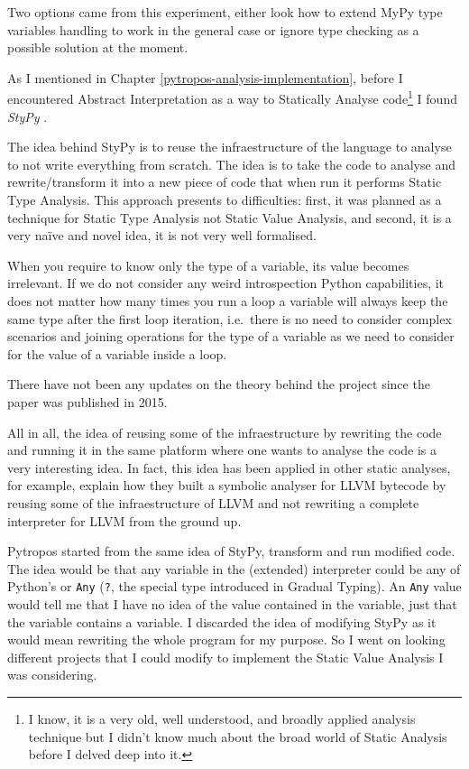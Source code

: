 Two options came from this experiment, either look how to extend MyPy
type variables handling to work in the general case or ignore type
checking as a possible solution at the moment.

{}

As I mentioned in Chapter \ref{pytropos-analysis-implementation}, before
I encountered Abstract Interpretation as a way to Statically Analyse
code\footnote{I know, it is a very old, well understood, and broadly
  applied analysis technique but I didn't know much about the broad
  world of Static Analysis before I delved deep into it.} I found
\emph{StyPy} \autocite{ortin_towards_2015}.

The idea behind StyPy is to reuse the infraestructure of the language to
analyse to not write everything from scratch. The idea is to take the
code to analyse and rewrite/transform it into a new piece of code that
when run it performs Static Type Analysis. This approach presents to
difficulties: first, it was planned as a technique for Static Type
Analysis not Static Value Analysis, and second, it is a very naïve and
novel idea, it is not very well formalised.

When you require to know only the type of a variable, its value becomes
irrelevant. If we do not consider any weird introspection Python
capabilities, it does not matter how many times you run a loop a
variable will always keep the same type after the first loop iteration,
i.e.~there is no need to consider complex scenarios and joining
operations for the type of a variable as we need to consider for the
value of a variable inside a loop.

There have not been any updates on the theory behind the project since
the paper was published in 2015.

All in all, the idea of reusing some of the infraestructure by rewriting
the code and running it in the same platform where one wants to analyse
the code is a very interesting idea. In fact, this idea has been applied
in other static analyses, for example, \textcite{lauko_symbolic_2018}
explain how they built a symbolic analyser for LLVM bytecode by reusing
some of the infraestructure of LLVM and not rewriting a complete
interpreter for LLVM from the ground up.

Pytropos started from the same idea of StyPy, transform and run modified
code. The idea would be that any variable in the (extended) interpreter
could be any of Python's or \texttt{Any} (\texttt{?}, the special type
introduced in Gradual Typing). An \texttt{Any} value would tell me that
I have no idea of the value contained in the variable, just that the
variable contains a variable. I discarded the idea of modifying StyPy as
it would mean rewriting the whole program for my purpose. So I went on
looking different projects that I could modify to implement the Static
Value Analysis I was considering.

